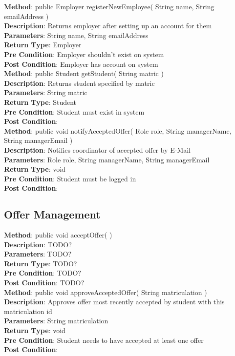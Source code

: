 \documentclass{l3deliverable}
\begin{document}
\textbf{Method}: public Employer registerNewEmployee( String name, String emailAddress )\\
\textbf{Description}: Returns employer after setting up an account for them\\
\textbf{Parameters}: String name, String emailAddress\\
\textbf{Return Type}: Employer\\
\textbf{Pre Condition}: Employer shouldn't exist on system\\
\textbf{Post Condition}: Employer has account on system\\

\textbf{Method}: public Student getStudent( String matric )\\
\textbf{Description}: Returns student specified by matric\\
\textbf{Parameters}: String matric\\
\textbf{Return Type}: Student\\
\textbf{Pre Condition}: Student must exist in system\\
\textbf{Post Condition}:\\

\textbf{Method}: public void notifyAcceptedOffer( Role role, String managerName, String managerEmail )\\
\textbf{Description}: Notifies coordinator of accepted offer by E-Mail\\
\textbf{Parameters}: Role role, String managerName, String managerEmail\\
\textbf{Return Type}: void\\
\textbf{Pre Condition}: Student must be logged in\\
\textbf{Post Condition}:\\

\subsection{Offer Management}
\textbf{Method}: public void acceptOffer( ) \\
\textbf{Description}: TODO?\\
\textbf{Parameters}: TODO?\\
\textbf{Return Type}: TODO?\\
\textbf{Pre Condition}: TODO?\\
\textbf{Post Condition}: TODO?\\

\textbf{Method}: public void approveAcceptedOffer( String matriculation )\\
\textbf{Description}: Approves offer most recently accepted by student with this matriculation id\\
\textbf{Parameters}: String matriculation\\
\textbf{Return Type}: void\\
\textbf{Pre Condition}: Student needs to have accepted at least one offer \\
\textbf{Post Condition}:\\
\end{document}
